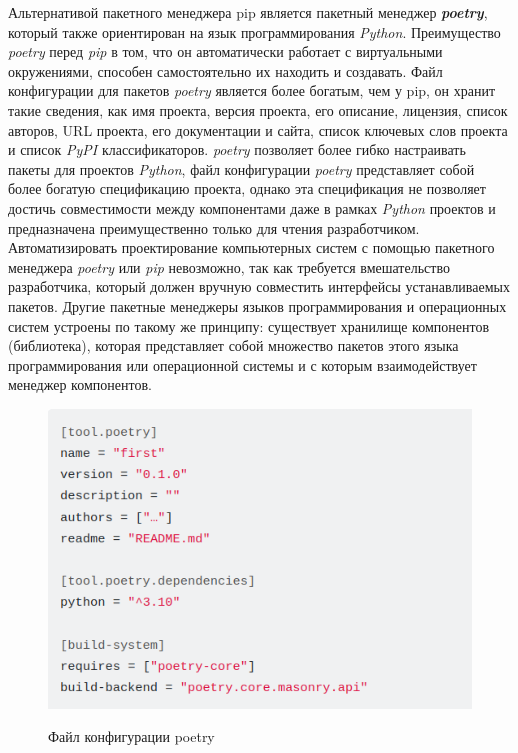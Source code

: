 Альтернативой пакетного менеджера pip является пакетный менеджер \textbf{\textit{poetry}}, который также ориентирован на язык программирования \textit{Python}. Преимущество \textit{poetry} перед \textit{pip} в том, что он автоматически работает с виртуальными окружениями, способен самостоятельно их находить и создавать. Файл конфигурации для пакетов \textit{poetry} является более богатым, чем у pip, он хранит такие сведения, как имя проекта, версия проекта, его описание, лицензия, список авторов, URL проекта, его документации и сайта, список ключевых слов проекта и список \textit{PyPI} классификаторов. \textit{poetry} позволяет более гибко настраивать пакеты для проектов \textit{Python}, файл конфигурации \textit{poetry} представляет собой более богатую спецификацию проекта, однако эта спецификация не позволяет достичь совместимости между компонентами даже в рамках \textit{Python} проектов и предназначена преимущественно только для чтения разработчиком. Автоматизировать проектирование компьютерных систем с помощью пакетного менеджера \textit{poetry} или \textit{pip} невозможно, так как требуется вмешательство разработчика, который должен вручную совместить интерфейсы устанавливаемых пакетов. Другие пакетные менеджеры языков программирования и операционных систем устроены по такому же принципу: существует хранилище компонентов (библиотека), которая представляет собой множество пакетов этого языка программирования или операционной системы и с которым взаимодействует менеджер компонентов.

\begin{figure}[H]
	\caption{Файл конфигурации poetry}
	\includegraphics[scale=0.7]{author/part5/figures/poetry.png}
	\label{fig:poetry}
\end{figure}

